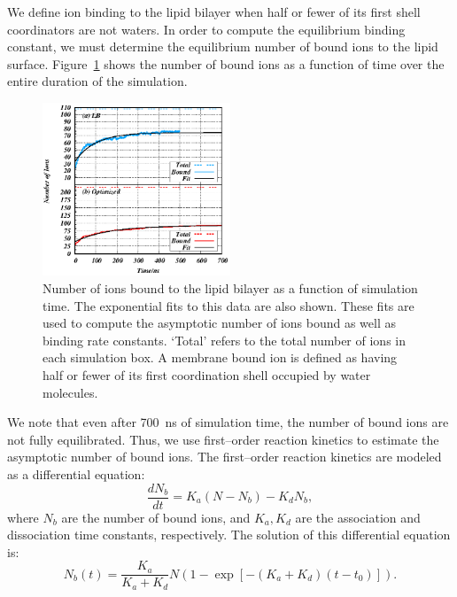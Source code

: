 \documentclass[12pt,openany,final]{book}
\begin{document}
We define ion binding to the lipid bilayer when half or fewer
of its first shell coordinators are not waters. 
In order to compute the equilibrium binding constant, 
we must determine the equilibrium number of bound ions to the lipid surface. 
Figure~\ref{fig:ioncoodcount} shows the number of bound ions as a
function of time over the entire duration of the simulation. 
\begin{figure}[h!]
    \caption[Number of ions bound to the bilayer vs time]{
Number of ions bound to the lipid bilayer as a function of simulation time. 
The exponential fits to this data are also shown. These fits are used to compute the asymptotic
number of ions bound as well as binding rate constants.
`Total' refers to the total number of ions in each simulation box.
A membrane bound ion is defined as having half or fewer of its first coordination shell
occupied by water molecules.}
    \label{fig:ioncoodcount}
    \includegraphics[width=0.5\textwidth,trim=-0cm 0 0 0]{figure_3_ch1.eps}
\end{figure}
We note that even after 700~ns of simulation time, the number of bound ions
are not fully equilibrated. 
Thus, we use first--order reaction kinetics to
estimate the asymptotic number of bound ions.  
The first--order reaction kinetics are modeled as a differential equation:
\begin{equation}
    \frac{dN_b}{dt}=K_a \left(N-N_b\right)- K_d N_b,
\end{equation}
where $N_b$ are the number of bound ions, and $K_a,K_d$ are the association and dissociation
time constants, respectively.
The solution of this differential equation is:
\begin{equation}
    N_b(t)= \frac{K_{a}}{K_{a}+K_{d}} N
    \left(1-\exp\left[-\left(K_{a}+K_{d}\right)\left(t-t_0\right)\right]\right).
    \label{eq:ioncoodnumfit}
\end{equation}
\end{document}
